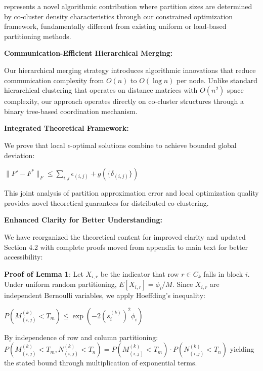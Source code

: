 \documentclass{ar2rc}
\begin{document}
represents a novel algorithmic contribution where partition sizes are determined by co-cluster density characteristics through our constrained optimization framework, fundamentally different from existing uniform or load-based partitioning methods.

\textbf{Communication-Efficient Hierarchical Merging:}

Our hierarchical merging strategy introduces algorithmic innovations that reduce communication complexity from $O(n)$ to $O(\log n)$ per node. Unlike standard hierarchical clustering that operates on distance matrices with $O(n^2)$ space complexity, our approach operates directly on co-cluster structures through a binary tree-based coordination mechanism.

\textbf{Integrated Theoretical Framework:}

We prove that local $\epsilon$-optimal solutions combine to achieve bounded global deviation:

$\|F' - F^*\|_F \leq \sum_{i,j} \epsilon_{(i,j)} + g(\{\delta_{(i,j)}\})$

This joint analysis of partition approximation error and local optimization quality provides novel theoretical guarantees for distributed co-clustering.



\textbf{Enhanced Clarity for Better Understanding:}

We have reorganized the theoretical content for improved clarity and updated Section 4.2 with complete proofs moved from appendix to main text for better accessibility:

\textbf{Proof of Lemma 1}: Let $X_{i,r}$ be the indicator that row $r \in C_k$ falls in block $i$. Under uniform random partitioning, $E[X_{i,r}] = \phi_i/M$. Since $X_{i,r}$ are independent Bernoulli variables, we apply Hoeffding's inequality:

$P(M_{(i,j)}^{(k)} < T_m) \leq \exp\left(-2(s_i^{(k)})^2 \phi_i\right)$

By independence of row and column partitioning:
$P(M_{(i,j)}^{(k)} < T_m, N_{(i,j)}^{(k)} < T_n) = P(M_{(i,j)}^{(k)} < T_m) \cdot P(N_{(i,j)}^{(k)} < T_n)$
yielding the stated bound through multiplication of exponential terms.
\end{document}
